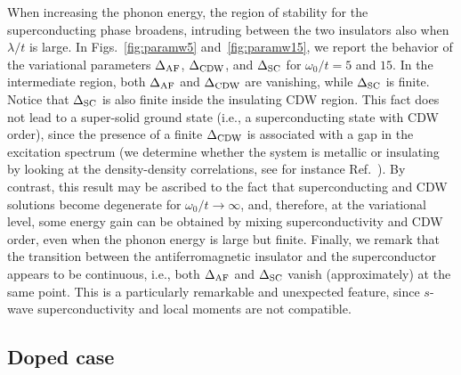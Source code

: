 \documentclass[aps,superscriptaddress,amsmath,amssymb,twocolumn,showpacs,floatfix,english]{revtex4}
\begin{document}
When increasing the phonon energy, the region of stability for the superconducting phase broadens, intruding between the two insulators 
also when $\lambda/t$ is large. In Figs.~\ref{fig:paramw5} and~\ref{fig:paramw15}, we report the behavior of the variational parameters 
$\Delta_{\rm AF}$, $\Delta_{\rm CDW}$, and $\Delta_{\rm SC}$ for $\omega_0/t=5$ and $15$. In the intermediate region, both $\Delta_{\rm AF}$ 
and $\Delta_{\rm CDW}$ are vanishing, while $\Delta_{\rm SC}$ is finite. Notice that $\Delta_{\rm SC}$ is also finite inside the insulating 
CDW region. This fact does not lead to a super-solid ground state (i.e., a superconducting state with CDW order), since the presence of a
finite $\Delta_{\rm CDW}$ is associated with a gap in the excitation spectrum (we determine whether the system is metallic or insulating  
by looking at the density-density correlations, see for instance Ref.~). By contrast, this result may be ascribed to 
the fact that superconducting and CDW solutions become degenerate for $\omega_0/t \to \infty$, and, therefore, at the variational level, 
some energy gain can be obtained by mixing superconductivity and CDW order, even when the phonon energy is large but finite. Finally, we 
remark that the transition between the antiferromagnetic insulator and the superconductor appears to be continuous, i.e., both $\Delta_{\rm AF}$ 
and $\Delta_{\rm SC}$ vanish (approximately) at the same point. This is a particularly remarkable and unexpected feature, since $s$-wave 
superconductivity and local moments are not compatible.

\subsection{Doped case}
\end{document}
